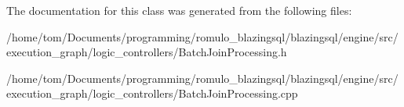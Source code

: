 The documentation for this class was generated from the following files\+:\begin{DoxyCompactItemize}
\item 
/home/tom/\+Documents/programming/romulo\+\_\+blazingsql/blazingsql/engine/src/execution\+\_\+graph/logic\+\_\+controllers/Batch\+Join\+Processing.\+h\item 
/home/tom/\+Documents/programming/romulo\+\_\+blazingsql/blazingsql/engine/src/execution\+\_\+graph/logic\+\_\+controllers/Batch\+Join\+Processing.\+cpp\end{DoxyCompactItemize}
